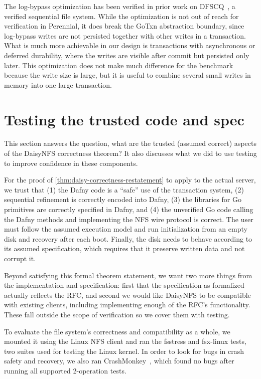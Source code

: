 The log-bypass optimization has been verified in prior work on
DFSCQ~\cite{chen:dfscq}, a verified sequential file system. While the
optimization is not out of reach for verification in Perennial, it does break
the GoTxn abstraction boundary, since log-bypass writes are not persisted
together with other writes in a transaction. What is much more achievable in our design is
transactions with asynchronous or deferred durability, where the writes are
visible after commit but persisted only later. This optimization does not make
much difference for the  benchmark because the write size is
large, but it is useful to combine several small writes in memory into one large
transaction.

\section{Testing the trusted code and spec}
\label{sec:eval:testing}

This section answers the question, what are the trusted (assumed correct)
aspects of the DaisyNFS correctness theorem? It also discusses what we did to
use testing to improve confidence in these components.

For the proof of \cref{thm:daisy-correctness-restatement} to apply to the actual server, we trust that (1) the
Dafny code is a ``safe'' use of the transaction system, (2) sequential
refinement is correctly encoded into Dafny, (3) the libraries for Go primitives
are correctly specified in Dafny, and (4) the unverified Go code calling the
Dafny methods and implementing the NFS wire protocol is correct. The
user must follow the assumed execution model and run initialization from an
empty disk and recovery after each boot. Finally, the disk needs to behave
according to its assumed specification, which requires that it preserve written
data and not corrupt it.

Beyond satisfying this formal theorem statement, we want two more things from
the implementation and specification: first that the specification as formalized
actually reflects the RFC, and second we would like DaisyNFS to be compatible
with existing clients, including implementing enough of the RFC's functionality.
These fall outside the scope of verification so we cover them with testing.

To evaluate the file system's correctness and compatibility as a whole, we
mounted it using the Linux NFS client and ran the fsstress and fsx-linux tests,
two suites used for testing the Linux kernel. In order to look for bugs in crash
safety and recovery, we also ran CrashMonkey~\cite{mohan:crashmonkey}, which
found no bugs after running all supported 2-operation tests.


